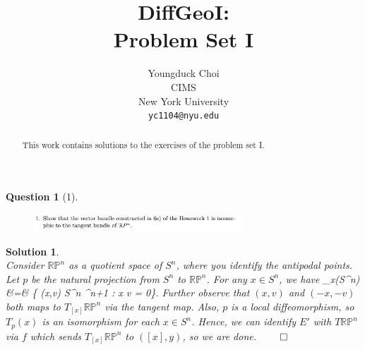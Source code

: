 \documentclass{article} %
\title{DiffGeoI: \\
Problem Set I}
\author{
Youngduck Choi \\
CIMS \\
New York University\\
\texttt{yc1104@nyu.edu} \\
}
\def\eQb#1\eQe{\begin{eqnarray*}#1\end{eqnarray*}}
\theoremstyle{quest}
\newtheorem*{question}{Question}
\newtheorem*{solution}{Solution}
\begin{document}
\maketitle

\begin{abstract}
This work contains solutions to the exercises of the problem set I.
\end{abstract}

\bigskip

\begin{question}[1]
\hfill
\begin{figure}[h!]
  \centering
    \includegraphics[width=0.7\textwidth]{DG-e3-p1.png}
\end{figure}
\end{question}
\begin{solution} \hfill \\
Consider $\mathbb{RP}^n$ as a quotient space of $S^n$, where you identify
the antipodal points. Let $p$ be the natural projection from $S^n$ to $\mathbb{RP}^n$.
For any $x \in S^n$, we have
\eQb
T_x(S^n) &=& \{ (x,v) \in S^n \times {}^{n+1} : x \cdot v = 0\}.
\eQe
Further observe that $(x,v)$ and $(-x,-v)$ both maps to $T_{[x]}\mathbb{RP}^n$
via the tangent map. Also, $p$ is a local diffeomorphism, so $T_p(x)$ is an isomorphism
for each $x \in S^n$. Hence, we can identify $E'$ with $T\mathbb{RP}^{n}$ via 
$f$ which sends $T_{[x]}\mathbb{RP}^{n}$ to  $([x],y)$, so we are done. \hfill
$\qed$ 

\end{solution}

\bigskip
\end{document}
